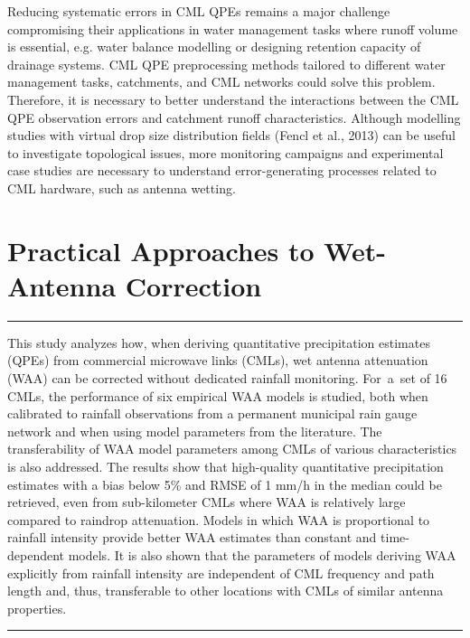 \documentclass{ctuthesis}\usepackage[]{graphicx}\usepackage[]{color}
\begin{document}
Reducing systematic errors in CML QPEs remains a major challenge compromising their applications in water management tasks where runoff volume is essential, e.g. water balance modelling or designing retention capacity of drainage systems. CML QPE preprocessing methods tailored to different water management tasks, catchments, and CML networks could solve this problem. Therefore, it is necessary to better understand the interactions between the CML QPE observation errors and catchment runoff characteristics. Although modelling studies with virtual drop size distribution fields (Fencl et al., 2013) can be useful to investigate topological issues, more monitoring campaigns and experimental case studies are necessary to understand error-generating processes related to CML hardware, such as antenna wetting.





        


\chapter{Practical Approaches to Wet-Antenna Correction} \label{chap6}

\rule{\textwidth}{0.4pt}
This study analyzes how, when deriving quantitative precipitation estimates (QPEs) from commercial microwave links (CMLs),  wet antenna attenuation (WAA) can be corrected without dedicated rainfall monitoring. For~a~set of 16 CMLs, the performance of six empirical WAA models is studied, both when calibrated to rainfall observations from a permanent municipal rain gauge network and when using model parameters from the literature. The transferability of WAA model parameters among CMLs of various characteristics is also addressed. The results show that high-quality quantitative precipitation estimates with a bias below 5\% and RMSE of 1 mm/h in the median could be retrieved, even from sub-kilometer CMLs where WAA is relatively large compared to raindrop attenuation. Models in which WAA is proportional to rainfall intensity provide better WAA estimates than constant and time-dependent models. It is also shown that the parameters of models deriving WAA explicitly from rainfall intensity are independent of CML frequency and path length and, thus, transferable to other locations with CMLs of similar antenna properties.
\rule[0.2cm]{\textwidth}{0.4pt}
\end{document}
